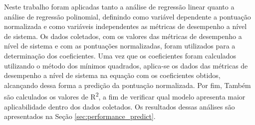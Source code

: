 Neste trabalho foram aplicadas tanto a análise de regressão linear quanto a análise de regressão polinomial, definindo como variável dependente a pontuação normalizada e como variáveis independentes as métricas de desempenho a nível de sistema. Os dados coletados, com os valores das métricas de desempenho a nível de sistema e com as pontuações normalizadas, foram utilizados para a  determinação dos coeficientes. Uma vez que os coeficientes foram calculados utilizando o método dos mínimos quadrados, aplica-se os dados das métricas de desempenho a nível de sistema na equação com os coeficientes obtidos, alcançando dessa forma a predição da pontuação normalizada. Por fim, Também são calculados os valores de R\textsuperscript{2}, a fim de verificar qual modelo apresenta maior aplicabilidade dentro dos dados coletados. Os resultados dessas análises são apresentados na Seção \ref{sec:performance_predict}.




